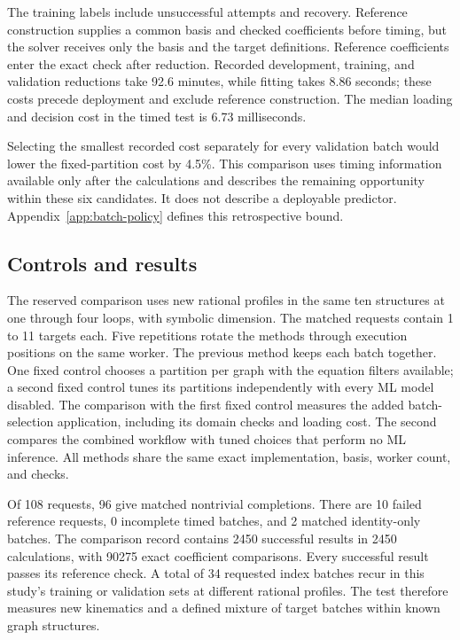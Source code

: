 The training labels include unsuccessful attempts and recovery. Reference construction supplies a common basis and checked coefficients before timing, but the solver receives only the basis and the target definitions. Reference coefficients enter the exact check after reduction. Recorded development, training, and validation reductions take 92.6 minutes, while fitting takes 8.86 seconds; these costs precede deployment and exclude reference construction. The median loading and decision cost in the timed test is 6.73 milliseconds.


Selecting the smallest recorded cost separately for every validation batch would lower the fixed-partition cost by 4.5\%. This comparison uses timing information available only after the calculations and describes the remaining opportunity within these six candidates. It does not describe a deployable predictor. Appendix~\ref{app:batch-policy} defines this retrospective bound.

\subsection{Controls and results}
The reserved comparison uses new rational profiles in the same ten structures at one through four loops, with symbolic dimension. The matched requests contain 1 to 11 targets each. Five repetitions rotate the methods through execution positions on the same worker. The previous method keeps each batch together. One fixed control chooses a partition per graph with the equation filters available; a second fixed control tunes its partitions independently with every ML model disabled. The comparison with the first fixed control measures the added batch-selection application, including its domain checks and loading cost. The second compares the combined workflow with tuned choices that perform no ML inference. All methods share the same exact implementation, basis, worker count, and checks.

Of 108 requests, 96 give matched nontrivial completions. There are 10 failed reference requests, 0 incomplete timed batches, and 2 matched identity-only batches. The comparison record contains 2450 successful results in 2450 calculations, with 90275 exact coefficient comparisons. Every successful result passes its reference check. A total of 34 requested index batches recur in this study's training or validation sets at different rational profiles. The test therefore measures new kinematics and a defined mixture of target batches within known graph structures.


